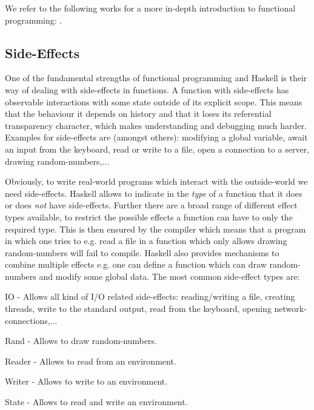 We refer to the following works for a more in-depth introduction to functional programming: \citep{hughes_why_1989}.

\subsection{Side-Effects}
One of the fundamental strengths of functional programming and Haskell is their way of dealing with side-effects in functions. A function with side-effects has observable interactions with some state outside of its explicit scope. This means that the behaviour it depends on history and that it loses its referential transparency character, which makes understanding and debugging much harder. Examples for side-effects are (amongst others): modifying a global variable, await an input from the keyboard, read or write to a file, open a connection to a server, drawing random-numbers,...

Obviously, to write real-world programs which interact with the outside-world we need side-effects. Haskell allows to indicate in the \textit{type} of a function that it does or does \textit{not} have side-effects. Further there are a broad range of different effect types available, to restrict the possible effects a function can have to only the required type. This is then ensured by the compiler which means that a program in which one tries to e.g. read a file in a function which only allows drawing random-numbers will fail to compile. Haskell also provides mechanisms to combine multiple effects e.g. one can define a function which can draw random-numbers and modify some global data. The most common side-effect types are:
\begin{itemize*}
	\item IO - Allows all kind of I/O related side-effects: reading/writing a file, creating threads, write to the standard output, read from the keyboard, opening network-connections,... 
	\item Rand - Allows to draw random-numbers.
	\item Reader - Allows to read from an environment.
	\item Writer - Allows to write to an environment.
	\item State - Allows to read and write an environment.
\end{itemize*}

